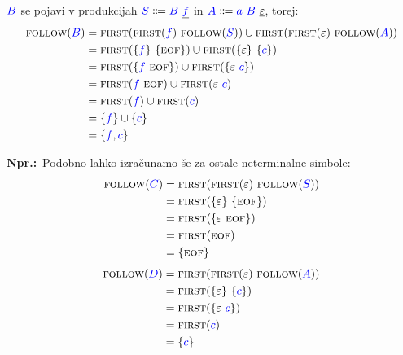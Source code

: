 \documentclass{article}
\newcommand{\Ex}{\textbf{Npr.:}\ }
\newcommand{\FIRST}{\textsc{first}}
\newcommand{\FOLLOW}{\textsc{follow}}
\newcommand{\EOF}{\textsc{eof}}
\newcommand{\Symbol}[1]{\textcolor{blue}{#1}}
\newcommand{\Null}{\varepsilon}
\newcommand{\Arrow}{\Coloneq}
\newcommand{\Seq}{\ }
\begin{document}
$\Symbol{B}$ se pojavi v produkcijah $\Symbol{S} \Arrow \Symbol{B} \Seq \underline{\Symbol{f}}$ in $\Symbol{A} \Arrow \Symbol{a} \Seq \Symbol{B} \Seq \underline{\Null}$, torej:
\begin{align*}
  \FOLLOW(\Symbol{B}) &= \FIRST(\FIRST(\Symbol{f}) \Seq \FOLLOW(\Symbol{S})) \cup \FIRST(\FIRST(\Null) \Seq \FOLLOW(\Symbol{A})) \\
             &= \FIRST(\{\Symbol{f}\} \Seq \{\EOF\}) \cup \FIRST(\{\Null\} \Seq \{\Symbol{c}\}) \\
             &= \FIRST(\{\Symbol{f} \Seq \EOF\}) \cup \FIRST(\{\Null \Seq \Symbol{c}\}) \\
             &= \FIRST(\Symbol{f} \Seq \EOF) \cup \FIRST(\Null \Seq \Symbol{c}) \\
             &= \FIRST(\Symbol{f}) \cup \FIRST(\Symbol{c})\\
             &= \{\Symbol{f}\} \cup \{\Symbol{c}\}\\
             &= \{\Symbol{f}, \Symbol{c}\}
\end{align*}


\Ex Podobno lahko izračunamo še za ostale neterminalne simbole:
\begin{align*}
  \FOLLOW(\Symbol{C}) &= \FIRST(\FIRST(\Null) \Seq \FOLLOW(\Symbol{S})) \\
             &= \FIRST(\{\Null\} \Seq \{\EOF\})\\
             &= \FIRST(\{\Null \Seq \EOF\})\\
             &= \FIRST(\EOF) \\
             &= \{\EOF\}
\end{align*}
\begin{align*}
  \FOLLOW(\Symbol{D}) &= \FIRST(\FIRST(\Null) \Seq \FOLLOW(\Symbol{A})) \\
             &= \FIRST(\{\Null\} \Seq \{\Symbol{c}\})\\
             &= \FIRST(\{\Null \Seq \Symbol{c}\})\\
             &= \FIRST(\Symbol{c}) \\
             &= \{\Symbol{c}\}
\end{align*}
\end{document}
